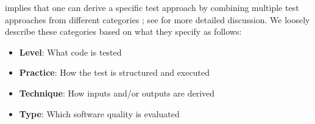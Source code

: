 implies that one can derive a specific test approach by combining multiple
test approaches from different categories\ifnotpaper
    ; see  for more detailed discussion\fi.
We loosely describe these categories based on what they specify
as follows:
\begin{itemize}
    \item \textbf{Level}: What code is tested
    \item \textbf{Practice}: How the test is structured and executed
    \item \textbf{Technique}: How inputs and/or outputs are derived
    \item \textbf{Type}: Which software quality is evaluated
\end{itemize}



